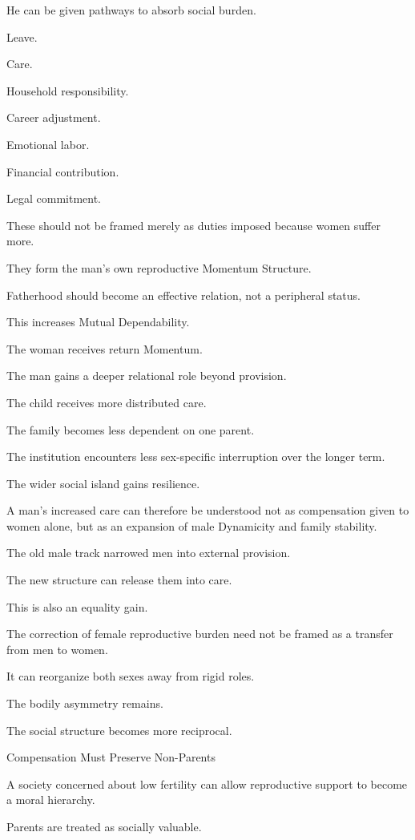 He can be given pathways to absorb social burden.

Leave.

Care.

Household responsibility.

Career adjustment.

Emotional labor.

Financial contribution.

Legal commitment.

These should not be framed merely as duties imposed because women suffer more.

They form the man’s own reproductive Momentum Structure.

Fatherhood should become an effective relation, not a peripheral status.

This increases Mutual Dependability.

The woman receives return Momentum.

The man gains a deeper relational role beyond provision.

The child receives more distributed care.

The family becomes less dependent on one parent.

The institution encounters less sex-specific interruption over the longer term.

The wider social island gains resilience.

A man’s increased care can therefore be understood not as compensation given to women alone, but as an expansion of male Dynamicity and family stability.

The old male track narrowed men into external provision.

The new structure can release them into care.

This is also an equality gain.

The correction of female reproductive burden need not be framed as a transfer from men to women.

It can reorganize both sexes away from rigid roles.

The bodily asymmetry remains.

The social structure becomes more reciprocal.

Compensation Must Preserve Non-Parents

A society concerned about low fertility can allow reproductive support to become a moral hierarchy.

Parents are treated as socially valuable.

